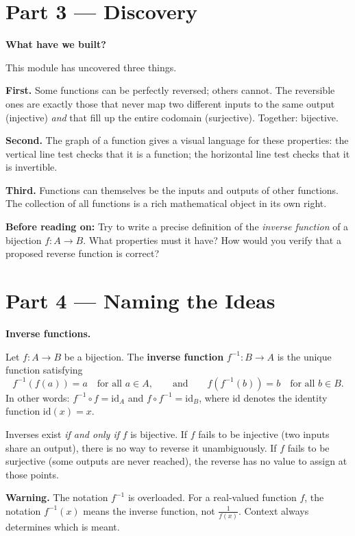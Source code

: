 \documentclass[12pt, a4paper]{article}
\begin{document}
\section{Part 3 \texorpdfstring{---}{--} Discovery}

\begin{discoverybox}
\textbf{What have we built?}

This module has uncovered three things.

\medskip
\textbf{First.} Some functions can be perfectly reversed; others cannot. The reversible ones are exactly those that never map two different inputs to the same output (injective) \emph{and} that fill up the entire codomain (surjective). Together: bijective.

\medskip
\textbf{Second.} The graph of a function gives a visual language for these properties: the vertical line test checks that it is a function; the horizontal line test checks that it is invertible.

\medskip
\textbf{Third.} Functions can themselves be the inputs and outputs of other functions. The collection of all functions is a rich mathematical object in its own right.

\medskip
\textbf{Before reading on:} Try to write a precise definition of the \emph{inverse function} of a bijection $f : A \to B$. What properties must it have? How would you verify that a proposed reverse function is correct?
\end{discoverybox}

\section{Part 4 \texorpdfstring{---}{--} Naming the Ideas}

\begin{namebox}
\textbf{Inverse functions.}

Let $f : A \to B$ be a bijection. The \textbf{inverse function} $f^{-1} : B \to A$ is the unique function satisfying
\[
  f^{-1}(f(a)) = a \quad \text{for all } a \in A,
  \qquad\text{and}\qquad
  f(f^{-1}(b)) = b \quad \text{for all } b \in B.
\]
In other words: $f^{-1} \circ f = \mathrm{id}_A$ and $f \circ f^{-1} = \mathrm{id}_B$, where $\mathrm{id}$ denotes the identity function $\mathrm{id}(x) = x$.

Inverses exist \emph{if and only if} $f$ is bijective. If $f$ fails to be injective (two inputs share an output), there is no way to reverse it unambiguously. If $f$ fails to be surjective (some outputs are never reached), the reverse has no value to assign at those points.

\medskip
\textbf{Warning.} The notation $f^{-1}$ is overloaded. For a real-valued function $f$, the notation $f^{-1}(x)$ means the inverse function, not $\tfrac{1}{f(x)}$. Context always determines which is meant.
\end{namebox}
\end{document}
